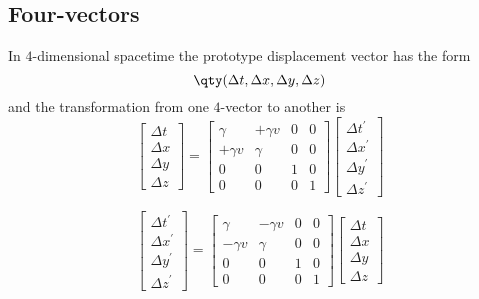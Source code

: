 \subsection{Four-vectors}
\label{sec:four-vectors}

In $4$-dimensional spacetime the prototype displacement vector has the form
\[ \qty( \Delta t , \Delta x, \Delta y, \Delta z ) \]
and the transformation from one $4$-vector to another is 
\begin{equation}
  \label{eq:2}
  \begin{bmatrix}
    \Delta t \\ \Delta x \\ \Delta y \\ \Delta z
  \end{bmatrix}
=
\begin{bmatrix}
  \gamma & + \gamma v & 0 & 0 \\
+ \gamma v & \gamma &0 & 0 \\
0 & 0 & 1 & 0 \\
0 & 0 & 0 & 1
\end{bmatrix}
\begin{bmatrix}
  \Delta t^{\prime} \\ \Delta x^{\prime} \\ \Delta y^{\prime} \\ \Delta z^{\prime}
\end{bmatrix}
\end{equation}

\begin{equation}
  \label{eq:2}
\begin{bmatrix}
  \Delta t^{\prime} \\ \Delta x^{\prime} \\ \Delta y^{\prime} \\ \Delta z^{\prime}
\end{bmatrix}
=
\begin{bmatrix}
  \gamma & - \gamma v & 0 & 0 \\
- \gamma v & \gamma &0 & 0 \\
0 & 0 & 1 & 0 \\
0 & 0 & 0 & 1
\end{bmatrix}
  \begin{bmatrix}
    \Delta t \\ \Delta x \\ \Delta y \\ \Delta z
  \end{bmatrix}
\end{equation}

